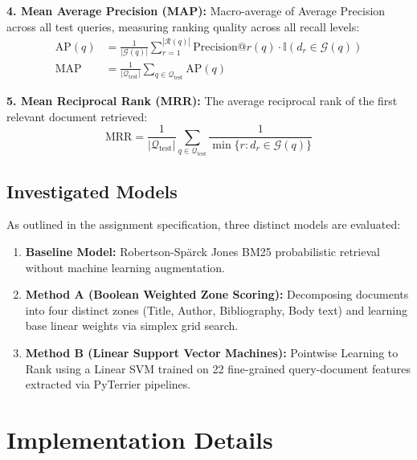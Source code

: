 \documentclass[11pt,a4paper]{article}
\begin{document}
\textbf{4. Mean Average Precision (MAP):} Macro-average of Average Precision across all test queries, measuring ranking quality across all recall levels:
\begin{align}
\text{AP}(q) &= \frac{1}{|\mathcal{G}(q)|} \sum_{r=1}^{|\mathcal{R}(q)|} \text{Precision}@r(q) \cdot \mathbb{I}(d_r \in \mathcal{G}(q)) \label{eq:ap} \\
\text{MAP} &= \frac{1}{|\mathcal{Q}_{\text{test}}|} \sum_{q \in \mathcal{Q}_{\text{test}}} \text{AP}(q) \label{eq:map}
\end{align}

\textbf{5. Mean Reciprocal Rank (MRR):} The average reciprocal rank of the first relevant document retrieved:
\begin{equation}
\text{MRR} = \frac{1}{|\mathcal{Q}_{\text{test}}|} \sum_{q \in \mathcal{Q}_{\text{test}}} \frac{1}{\min \{r : d_r \in \mathcal{G}(q)\}}
\label{eq:mrr}
\end{equation}

\subsection{Investigated Models}
As outlined in the assignment specification, three distinct models are evaluated:
\begin{enumerate}[leftmargin=*]
    \item \textbf{Baseline Model:} Robertson-Sp\"{a}rck Jones BM25 probabilistic retrieval without machine learning augmentation.
    \item \textbf{Method A (Boolean Weighted Zone Scoring):} Decomposing documents into four distinct zones (Title, Author, Bibliography, Body text) and learning base linear weights via simplex grid search.
    \item \textbf{Method B (Linear Support Vector Machines):} Pointwise Learning to Rank using a Linear SVM trained on 22 fine-grained query-document features extracted via PyTerrier pipelines.
\end{enumerate}

\section{Implementation Details}
\end{document}
